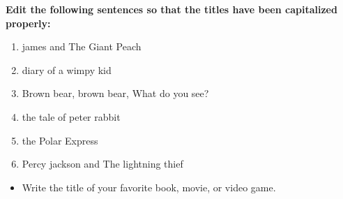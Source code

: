 \documentclass[12pt]{article}
\begin{document}
\vspace{1em}


\begin{tcolorbox}[colframe=black!60, colback=white, 
coltitle=black, colbacktitle=black!15, fonttitle=\bfseries\Large, 
title=Independent Practice, halign title=center, left=10pt, right=10pt, top=10pt, bottom=15pt]
\textbf{Edit the following sentences so that the titles have been capitalized properly:}
\begin{enumerate}[itemsep=1em] %
    \item james and The Giant Peach
    \item diary of a wimpy kid
    \item Brown bear, brown bear, What do you see?
    \item the tale of peter rabbit
    \item the Polar Express
    \item Percy jackson and The lightning thief



\end{enumerate}
\end{tcolorbox}

\vspace{1em}

\begin{tcolorbox}[colframe=black!60, colback=white, 
coltitle=black, colbacktitle=black!15, fonttitle=\bfseries\Large, 
title=Exit Ticket, halign title=center, left=10pt, right=10pt, top=10pt, bottom=15pt]

\begin{itemize}
    \item Write the title of your favorite book, movie, or video game.

\vspace{2em}

     \underline{\hspace{14.6cm}}  
    \\[0.8cm] \underline{\hspace{14.6cm}}  
    \\[0.8cm] \underline{\hspace{14.6cm}}

\end{itemize}
\end{tcolorbox}
\end{document}
